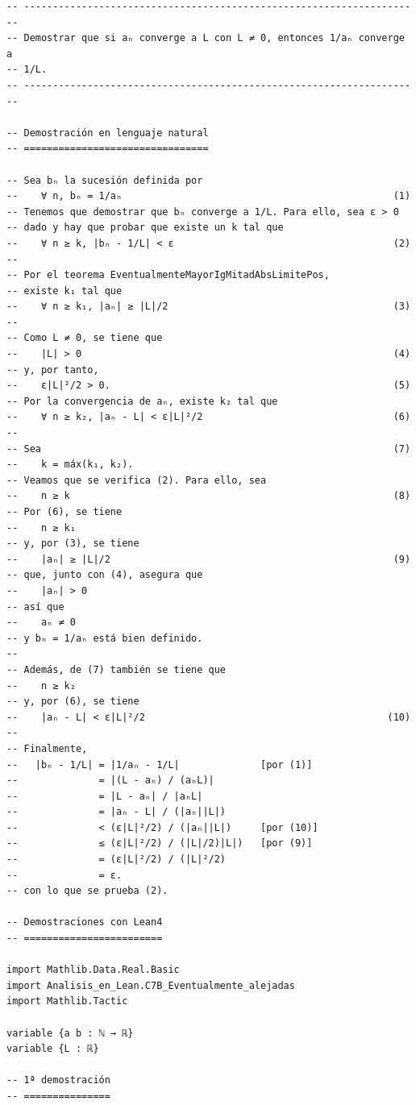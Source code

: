 \begin{verbatim}
-- ---------------------------------------------------------------------
-- Demostrar que si aₙ converge a L con L ≠ 0, entonces 1/aₙ converge a
-- 1/L.
-- ---------------------------------------------------------------------

-- Demostración en lenguaje natural
-- ================================

-- Sea bₙ la sucesión definida por
--    ∀ n, bₙ = 1/aₙ                                               (1)
-- Tenemos que demostrar que bₙ converge a 1/L. Para ello, sea ε > 0
-- dado y hay que probar que existe un k tal que
--    ∀ n ≥ k, |bₙ - 1/L| < ε                                      (2)
--
-- Por el teorema EventualmenteMayorIgMitadAbsLimitePos,
-- existe k₁ tal que
--    ∀ n ≥ k₁, |aₙ| ≥ |L|/2                                       (3)
--
-- Como L ≠ 0, se tiene que
--    |L| > 0                                                      (4)
-- y, por tanto,
--    ε|L|²/2 > 0.                                                 (5)
-- Por la convergencia de aₙ, existe k₂ tal que
--    ∀ n ≥ k₂, |aₙ - L| < ε|L|²/2                                 (6)
--
-- Sea                                                             (7)
--    k = máx(k₁, k₂).
-- Veamos que se verifica (2). Para ello, sea
--    n ≥ k                                                        (8)
-- Por (6), se tiene
--    n ≥ k₁
-- y, por (3), se tiene
--    |aₙ| ≥ |L|/2                                                 (9)
-- que, junto con (4), asegura que
--    |aₙ| > 0
-- así que
--    aₙ ≠ 0
-- y bₙ = 1/aₙ está bien definido.
--
-- Además, de (7) también se tiene que
--    n ≥ k₂
-- y, por (6), se tiene
--    |aₙ - L| < ε|L|²/2                                          (10)
--
-- Finalmente,
--   |bₙ - 1/L| = |1/aₙ - 1/L|              [por (1)]
--              = |(L - aₙ) / (aₙL)|
--              = |L - aₙ| / |aₙL|
--              = |aₙ - L| / (|aₙ||L|)
--              < (ε|L|²/2) / (|aₙ||L|)     [por (10)]
--              ≤ (ε|L|²/2) / (|L|/2)|L|)   [por (9)]
--              = (ε|L|²/2) / (|L|²/2)
--              = ε.
-- con lo que se prueba (2).

-- Demostraciones con Lean4
-- ========================

import Mathlib.Data.Real.Basic
import Analisis_en_Lean.C7B_Eventualmente_alejadas
import Mathlib.Tactic

variable {a b : ℕ → ℝ}
variable {L : ℝ}

-- 1ª demostración
-- ===============


\end{verbatim}
